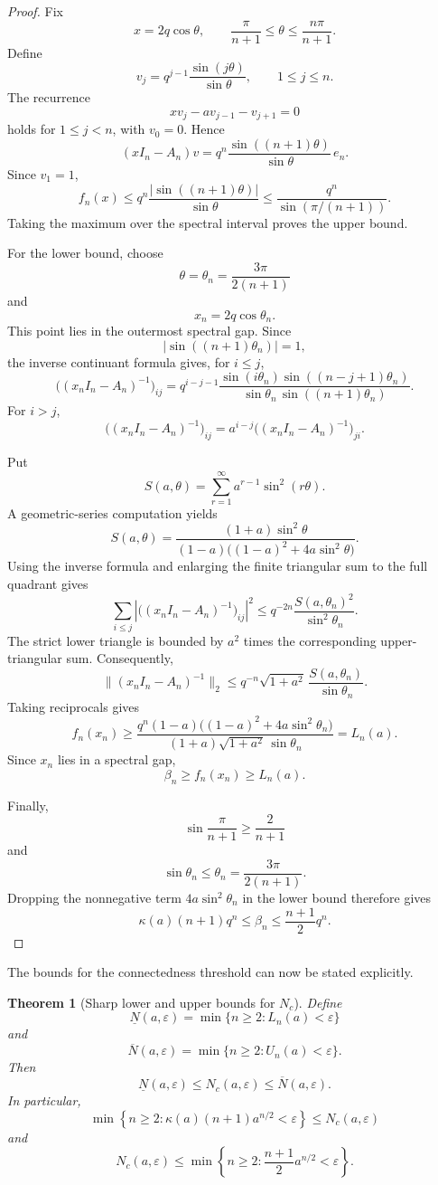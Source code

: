 \documentclass[11pt]{article}
\newtheorem{theorem}{Theorem}
\begin{document}
\begin{proof}
Fix
\[
x=2q\cos\theta,
\qquad
\frac{\pi}{n+1}\le\theta\le\frac{n\pi}{n+1}.
\]
Define
\[
v_j=q^{j-1}\frac{\sin(j\theta)}{\sin\theta},
\qquad
1\le j\le n.
\]
The recurrence
\[
xv_j-av_{j-1}-v_{j+1}=0
\]
holds for \(1\le j<n\), with \(v_0=0\). Hence
\[
(xI_n-A_n)v
=
q^n\frac{\sin((n+1)\theta)}{\sin\theta}\,e_n.
\]
Since \(v_1=1\),
\[
f_n(x)
\le
q^n
\frac{|\sin((n+1)\theta)|}{\sin\theta}
\le
\frac{q^n}{\sin(\pi/(n+1))}.
\]
Taking the maximum over the spectral interval proves the upper bound.

For the lower bound, choose
\[
\theta=\theta_n=\frac{3\pi}{2(n+1)}
\]
and
\[
x_n=2q\cos\theta_n.
\]
This point lies in the outermost spectral gap. Since
\[
|\sin((n+1)\theta_n)|=1,
\]
the inverse continuant formula gives, for \(i\le j\),
\[
\bigl((x_nI_n-A_n)^{-1}\bigr)_{ij}
=
q^{i-j-1}
\frac{
\sin(i\theta_n)
\sin((n-j+1)\theta_n)
}{
\sin\theta_n\,
\sin((n+1)\theta_n)
}.
\]
For \(i>j\),
\[
\bigl((x_nI_n-A_n)^{-1}\bigr)_{ij}
=
a^{i-j}
\bigl((x_nI_n-A_n)^{-1}\bigr)_{ji}.
\]

Put
\[
S(a,\theta)
=
\sum_{r=1}^{\infty}a^{r-1}\sin^2(r\theta).
\]
A geometric-series computation yields
\[
S(a,\theta)
=
\frac{
(1+a)\sin^2\theta
}{
(1-a)\bigl((1-a)^2+4a\sin^2\theta\bigr)
}.
\]
Using the inverse formula and enlarging the finite triangular sum to
the full quadrant gives
\[
\sum_{i\le j}
\left|
\bigl((x_nI_n-A_n)^{-1}\bigr)_{ij}
\right|^2
\le
q^{-2n}
\frac{S(a,\theta_n)^2}{\sin^2\theta_n}.
\]
The strict lower triangle is bounded by \(a^2\) times the corresponding
upper-triangular sum. Consequently,
\[
\|(x_nI_n-A_n)^{-1}\|_2
\le
q^{-n}\sqrt{1+a^2}\,
\frac{S(a,\theta_n)}{\sin\theta_n}.
\]
Taking reciprocals gives
\[
f_n(x_n)
\ge
\frac{
q^n(1-a)
\bigl((1-a)^2+4a\sin^2\theta_n\bigr)
}{
(1+a)\sqrt{1+a^2}\,\sin\theta_n
}
=
L_n(a).
\]
Since \(x_n\) lies in a spectral gap,
\[
\beta_n\ge f_n(x_n)\ge L_n(a).
\]

Finally,
\[
\sin\frac{\pi}{n+1}\ge\frac{2}{n+1}
\]
and
\[
\sin\theta_n\le\theta_n=\frac{3\pi}{2(n+1)}.
\]
Dropping the nonnegative term \(4a\sin^2\theta_n\) in the lower bound
therefore gives
\[
\kappa(a)(n+1)q^n
\le
\beta_n
\le
\frac{n+1}{2}q^n.
\]
\end{proof}

The bounds for the connectedness threshold can now be stated
explicitly.

\begin{theorem}[Sharp lower and upper bounds for \(N_c\)]
Define
\[
\underline N(a,\varepsilon)
=
\min\{n\ge2:L_n(a)<\varepsilon\}
\]
and
\[
\overline N(a,\varepsilon)
=
\min\{n\ge2:U_n(a)<\varepsilon\}.
\]
Then
\[
\boxed{
\underline N(a,\varepsilon)
\le
N_c(a,\varepsilon)
\le
\overline N(a,\varepsilon)
}.
\]
In particular,
\[
\boxed{
\min\left\{
n\ge2:
\kappa(a)(n+1)a^{n/2}<\varepsilon
\right\}
\le
N_c(a,\varepsilon)
}
\]
and
\[
\boxed{
N_c(a,\varepsilon)
\le
\min\left\{
n\ge2:
\frac{n+1}{2}a^{n/2}<\varepsilon
\right\}.
}
\]
\end{theorem}
\end{document}
